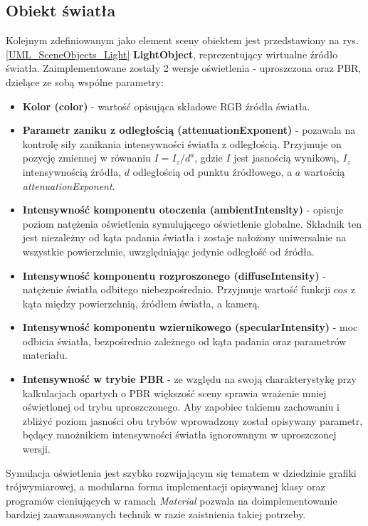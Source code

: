 \subsection{Obiekt światła}
	Kolejnym zdefiniowanym jako element sceny obiektem jest przedstawiony na rys. \ref{UML_SceneObjects_Light} \textbf{LightObject}, reprezentujący wirtualne źródło światła. Zaimplementowane zostały 2 wersje oświetlenia - uproszczona oraz PBR, dzielące ze sobą wspólne parametry:
	\begin{itemize}
		\item \textbf{Kolor (color)} - wartość opisująca składowe RGB źródła światła.
		\item \textbf{Parametr zaniku z odległością (attenuationExponent)} - pozawala na kontrolę siły zanikania intensywności światła z odległością. Przyjmuje on pozycję zmiennej w równaniu \(I = I_z / d^a\), gdzie \(I\) jest jasnością wynikową, \(I_z\) intensywnością źródła, \(d\) odległością od punktu źródłowego, a \(a\) wartością \textit{attenuationExponent}.
		\item \textbf{Intensywność komponentu otoczenia (ambientIntensity)} - opisuje poziom natężenia oświetlenia symulującego oświetlenie globalne. Składnik ten jest niezależny od kąta padania światła i zostaje nałożony uniwersalnie na wszystkie powierzchnie, uwzględniając jedynie odległość od źródła.
		\item \textbf{Intensywność komponentu rozproszonego (diffuseIntensity)} - natężenie światła odbitego niebezpośrednio. Przyjmuje wartość funkcji \(cos\) z kąta między powierzchnią, źródłem światła, a kamerą.
		\item \textbf{Intensywność komponentu wziernikowego (specularIntensity)} - moc odbicia światła, bezpośrednio zależnego od kąta padania oraz parametrów materiału.
		\item \textbf{Intensywność w trybie PBR} - ze względu na swoją charakterystykę przy kalkulacjach opartych o PBR większość sceny sprawia wrażenie mniej oświetlonej od trybu uproszczonego. Aby zapobiec takiemu zachowaniu i zbliżyć poziom jasności obu trybów wprowadzony został opisywany parametr, będący mnożnikiem intensywności światła ignorowanym w uproszczonej wersji.
	\end{itemize}
	
	Symulacja oświetlenia jest szybko rozwijającym się tematem w dziedzinie grafiki trójwymiarowej, a modularna forma implementacji opisywanej klasy oraz programów cieniujących w ramach \textit{Material} pozwala na doimplementowanie bardziej zaawansowanych technik w razie zaistnienia takiej potrzeby.
	
